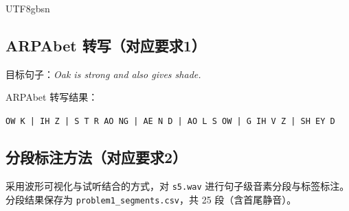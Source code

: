 \documentclass[12pt,a4paper]{article}
\begin{document}
\begin{CJK*}{UTF8}{gbsn}
\subsection{ARPAbet 转写（对应要求1）}
目标句子：\textit{Oak is strong and also gives shade.}

ARPAbet 转写结果：
\begin{center}
\texttt{OW K | IH Z | S T R AO NG | AE N D | AO L S OW | G IH V Z | SH EY D}
\end{center}

\subsection{分段标注方法（对应要求2）}
采用波形可视化与试听结合的方式，对 \texttt{s5.wav} 进行句子级音素分段与标签标注。分段结果保存为 \texttt{problem1\_segments.csv}，共 25 段（含首尾静音）。


\end{CJK*}
\end{document}
